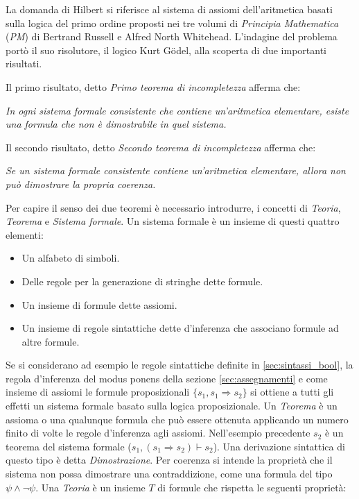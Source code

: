 \documentclass[./main.tex]{subfiles}
\begin{document}
La domanda di Hilbert si riferisce al sistema di assiomi dell'aritmetica
basati sulla logica del primo ordine proposti nei tre volumi di \textit{Principia Mathematica} (\textit{PM})
di Bertrand Russell e Alfred North Whitehead.
L'indagine del problema portò il suo risolutore, il logico Kurt Gödel, alla scoperta di due importanti risultati.

Il primo risultato, detto \textit{Primo teorema di incompletezza} afferma che:

\begin{displayquote}
  \textit{In ogni sistema formale consistente che contiene un'aritmetica elementare, esiste una formula che non è dimostrabile in quel sistema.}
\end{displayquote}

Il secondo risultato, detto \textit{Secondo teorema di incompletezza} afferma che:

\begin{displayquote}
  \textit{Se un sistema formale consistente contiene un'aritmetica elementare, allora non può dimostrare la propria coerenza.}
\end{displayquote}

Per capire il senso dei due teoremi è necessario introdurre, i concetti di \textit{Teoria}, \textit{Teorema} e \textit{Sistema formale}.
Un sistema formale è un insieme di questi quattro elementi:

\begin{itemize}
  \item Un alfabeto di simboli.
  \item Delle regole per la generazione di stringhe dette formule.
  \item Un insieme di formule dette assiomi.
  \item Un insieme di regole sintattiche dette d'inferenza che associano formule ad altre formule.
\end{itemize}

Se si considerano ad esempio le regole sintattiche definite in \ref{sec:sintassi_bool},
la regola d'inferenza del modus ponens della sezione \ref{sec:assegnamenti}
e come insieme di assiomi le formule proposizionali $\{s_1, s_1 \Rightarrow s_2\}$
si ottiene a tutti gli effetti un sistema formale basato sulla logica proposizionale.
Un \textit{Teorema} è un assioma o una qualunque formula che può essere ottenuta applicando un numero finito di volte le regole d'inferenza agli assiomi.
Nell'esempio precedente $s_2$ è un teorema del sistema formale ($s_1, (s_1 \Rightarrow s_2) \vdash s_2$).
Una derivazione sintattica di questo tipo è detta \textit{Dimostrazione}.
Per coerenza si intende la proprietà che il sistema non possa dimostrare una contraddizione,
come una formula del tipo $\psi \land \lnot \psi$.
Una \textit{Teoria} è un insieme $T$ di formule che rispetta le seguenti proprietà:
\end{document}
